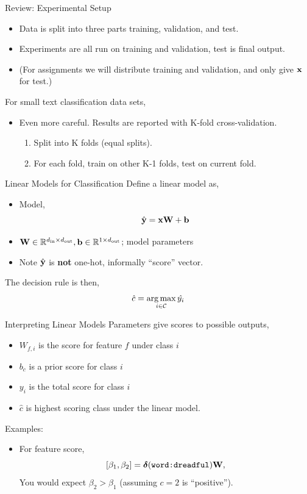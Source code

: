 \documentclass{beamer}
\begin{document}
\begin{frame}{Review: Experimental Setup}
  
  \begin{itemize}
  \item Data is split into three parts training, validation, and test.
  \item Experiments are all run on training and validation, test is final output.

  \item (For assignments we will distribute training and validation, and only give $\mathbf{x}$ for test.)
  \end{itemize}
  
  For small text classification data sets,
  \begin{itemize}
  \item Even more careful. Results are reported with K-fold cross-validation. 
    \begin{enumerate}
    \item Split into K folds (equal splits).
    \item For each fold, train on other K-1 folds, test on current fold. 
    \end{enumerate}
  \end{itemize}
\end{frame}


\begin{frame}{Linear Models for Classification}
  Define a linear model as,
  \begin{itemize}
  \item Model, \[\hat{\mathbf{y}} = \mathbf{x} \mathbf{W} + \mathbf{b}\]   
  \item $\mathbf{W} \in \mathbb{R}^{{d_{\mathrm{in}}} \times {d_{\mathrm{out}}}}, \mathbf{b} \in \mathbb{R}^{1 \times {d_{\mathrm{out}}}}$; model parameters
  \item Note $\hat{\mathbf{y}}$ is \textbf{not} one-hot, informally ``score'' vector. 
  \end{itemize}

  The decision rule is then,
  \[ \hat{c} = \argmax_{i \in \mcC} \hat{y_i} \]
\end{frame}


\begin{frame}{Interpreting Linear Models}
  Parameters give scores to possible outputs,
  \begin{itemize}
  \item $W_{f, i}$ is the score for feature $f$ under class $i$
  \item $b_c$ is a prior score for class $i$  
  \item $y_i$ is the total score for class $i$
  \item $\hat{c}$ is highest scoring class under the linear model.
  \end{itemize}

  Examples:
  \begin{itemize}
  \item For feature score, \[[\beta_1, \beta_2 ] = \boldsymbol{\delta}(\texttt{word:dreadful}) \mathbf{W},\]
    You would expect $\beta_2 > \beta_1$ (assuming $c=2$ is ``positive''). 
    
  \end{itemize}
\end{frame}
\end{document}
